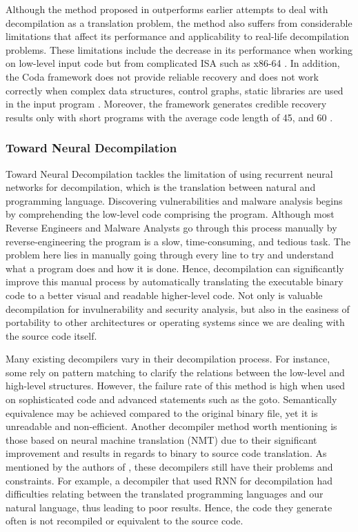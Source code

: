 \documentclass[conference,a4paper]{IEEEtran}
\begin{document}
Although the method proposed in \cite{fu_neural-based_2019} outperforms earlier attempts to deal with decompilation as a translation problem, the method also suffers from considerable limitations that affect its performance and applicability to real-life decompilation problems. These limitations include the decrease in its performance when working on low-level input code but from complicated ISA such as x86-64 \cite{fu_neural-based_2019}. In addition, the Coda framework does not provide reliable recovery and does not work correctly when complex data structures, control graphs, static libraries are used in the input program \cite{fu_neural-based_2019}. Moreover, the framework generates credible recovery results only with short programs with the average code length of 45, and 60 \cite{fu_neural-based_2019}. 

\subsubsection{Toward Neural Decompilation}

Toward Neural Decompilation tackles the limitation of using recurrent neural networks for decompilation, which is the translation between natural and programming language. Discovering vulnerabilities and malware analysis begins by comprehending the low-level code comprising the program. Although most Reverse Engineers and Malware Analysts go through this process manually by reverse-engineering
the program is a slow, time-consuming, and tedious task. The problem here lies in manually going through every line to try and understand what a program does and how it is done.
Hence, decompilation can significantly improve this manual process by automatically translating the executable binary code to a better visual and readable higher-level code. Not only is valuable decompilation for invulnerability and security analysis, but also in the
easiness of portability to other architectures or operating systems since we are dealing with the source code itself.

Many existing decompilers vary in their decompilation process. For instance, some rely on pattern matching to clarify the relations between the low-level and high-level structures. However, the failure rate of this method is high when used on sophisticated code and advanced statements
such as the goto. Semantically equivalence may be achieved compared to the original binary file, yet it is unreadable and non-efficient. Another decompiler method worth mentioning is those based on neural machine translation (NMT) due to their significant improvement and results in regards to binary to source code translation.
As mentioned by the authors of \cite{katz_towards_2019}, these decompilers still have their problems and constraints. For example, a decompiler that used RNN for decompilation had difficulties relating between the translated programming languages and our natural language, thus leading to poor results. Hence, the code they generate often is not recompiled or equivalent to the source code.
\end{document}
